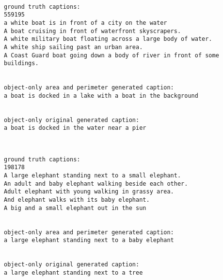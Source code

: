 \documentclass[11pt]{article}
\begin{document}
    \begin{center}
    \end{center}
    { \hspace*{\fill} \\}
    
    \begin{Verbatim}[commandchars=\\\{\}]
ground truth captions:
559195
a white boat is in front of a city on the water
A boat cruising in front of waterfront skyscrapers.
A white military boat floating across a large body of water.
A white ship sailing past an urban area.
A Coast Guard boat going down a body of river in front of some buildings.


object-only area and perimeter generated caption:
a boat is docked in a lake with a boat in the background


object-only original generated caption:
a boat is docked in the water near a pier

    \end{Verbatim}

    \begin{center}
    \end{center}
    { \hspace*{\fill} \\}
    
    \begin{Verbatim}[commandchars=\\\{\}]
ground truth captions:
198178
A large elephant standing next to a small elephant.
An adult and baby elephant walking beside each other.
Adult elephant with young walking in grassy area.
And elephant walks with its baby elephant. 
A big and a small elephant out in the sun 


object-only area and perimeter generated caption:
a large elephant standing next to a baby elephant


object-only original generated caption:
a large elephant standing next to a tree

    \end{Verbatim}

    \begin{center}
    \end{center}
    { \hspace*{\fill} \\}
    
\end{document}

